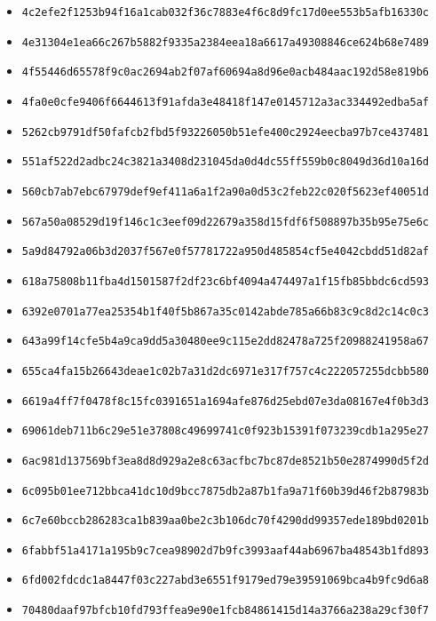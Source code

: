 {\begin{itemize}
    \item \texttt{4c2efe2f1253b94f16a1cab032f36c7883e4f6c8d9fc17d0ee553b5afb16330c}
    \item \texttt{4e31304e1ea66c267b5882f9335a2384eea18a6617a49308846ce624b68e7489}
    \item \texttt{4f55446d65578f9c0ac2694ab2f07af60694a8d96e0acb484aac192d58e819b6}
    \item \texttt{4fa0e0cfe9406f6644613f91afda3e48418f147e0145712a3ac334492edba5af}
    \item \texttt{5262cb9791df50fafcb2fbd5f93226050b51efe400c2924eecba97b7ce437481}
    \item \texttt{551af522d2adbc24c3821a3408d231045da0d4dc55ff559b0c8049d36d10a16d}
    \item \texttt{560cb7ab7ebc67979def9ef411a6a1f2a90a0d53c2feb22c020f5623ef40051d}
    \item \texttt{567a50a08529d19f146c1c3eef09d22679a358d15fdf6f508897b35b95e75e6c}
    \item \texttt{5a9d84792a06b3d2037f567e0f57781722a950d485854cf5e4042cbdd51d82af}
    \item \texttt{618a75808b11fba4d1501587f2df23c6bf4094a474497a1f15fb85bbdc6cd593}
    \item \texttt{6392e0701a77ea25354b1f40f5b867a35c0142abde785a66b83c9c8d2c14c0c3}
    \item \texttt{643a99f14cfe5b4a9ca9dd5a30480ee9c115e2dd82478a725f20988241958a67}
    \item \texttt{655ca4fa15b26643deae1c02b7a31d2dc6971e317f757c4c222057255dcbb580}
    \item \texttt{6619a4ff7f0478f8c15fc0391651a1694afe876d25ebd07e3da08167e4f0b3d3}
    \item \texttt{69061deb711b6c29e51e37808c49699741c0f923b15391f073239cdb1a295e27}
    \item \texttt{6ac981d137569bf3ea8d8d929a2e8c63acfbc7bc87de8521b50e2874990d5f2d}
    \item \texttt{6c095b01ee712bbca41dc10d9bcc7875db2a87b1fa9a71f60b39d46f2b87983b}
    \item \texttt{6c7e60bccb286283ca1b839aa0be2c3b106dc70f4290dd99357ede189bd0201b}
    \item \texttt{6fabbf51a4171a195b9c7cea98902d7b9fc3993aaf44ab6967ba48543b1fd893}
    \item \texttt{6fd002fdcdc1a8447f03c227abd3e6551f9179ed79e39591069bca4b9fc9d6a8}
    \item \texttt{70480daaf97bfcb10fd793ffea9e90e1fcb84861415d14a3766a238a29cf30f7}

\end{itemize}}
